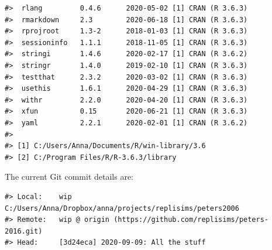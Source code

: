 \documentclass[
  english,
  doc,floatsintext,draftall]{apa6}
\begin{document}
\begin{verbatim}
#>  rlang         0.4.6      2020-05-02 [1] CRAN (R 3.6.3)              
#>  rmarkdown     2.3        2020-06-18 [1] CRAN (R 3.6.3)              
#>  rprojroot     1.3-2      2018-01-03 [1] CRAN (R 3.6.3)              
#>  sessioninfo   1.1.1      2018-11-05 [1] CRAN (R 3.6.3)              
#>  stringi       1.4.6      2020-02-17 [1] CRAN (R 3.6.2)              
#>  stringr       1.4.0      2019-02-10 [1] CRAN (R 3.6.3)              
#>  testthat      2.3.2      2020-03-02 [1] CRAN (R 3.6.3)              
#>  usethis       1.6.1      2020-04-29 [1] CRAN (R 3.6.3)              
#>  withr         2.2.0      2020-04-20 [1] CRAN (R 3.6.3)              
#>  xfun          0.15       2020-06-21 [1] CRAN (R 3.6.3)              
#>  yaml          2.2.1      2020-02-01 [1] CRAN (R 3.6.2)              
#> 
#> [1] C:/Users/Anna/Documents/R/win-library/3.6
#> [2] C:/Program Files/R/R-3.6.3/library
\end{verbatim}

The current Git commit details are:

\begin{verbatim}
#> Local:    wip C:/Users/Anna/Dropbox/anna/projects/replisims/peters2006
#> Remote:   wip @ origin (https://github.com/replisims/peters-2016.git)
#> Head:     [3d24eca] 2020-09-09: All the stuff
\end{verbatim}
\end{document}
